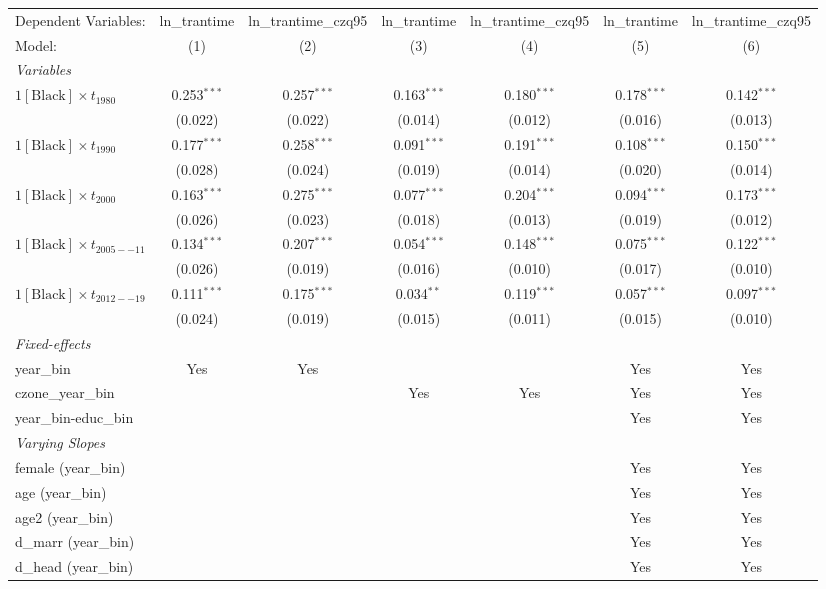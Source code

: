 \begin{tabular}{lcccccc}
\tabularnewline\midrule\midrule
Dependent Variables:&ln\_trantime&ln\_trantime\_czq95&ln\_trantime&ln\_trantime\_czq95&ln\_trantime&ln\_trantime\_czq95\\
Model:&(1) & (2) & (3) & (4) & (5) & (6)\\
\midrule \emph{Variables}&   &   &   &   &   &  \\
$1[\text{Black}] \times t_{1980}$ & 0.253$^{***}$ & 0.257$^{***}$ & 0.163$^{***}$ & 0.180$^{***}$ & 0.178$^{***}$ & 0.142$^{***}$\\
  &(0.022) & (0.022) & (0.014) & (0.012) & (0.016) & (0.013)\\
$1[\text{Black}] \times t_{1990}$ & 0.177$^{***}$ & 0.258$^{***}$ & 0.091$^{***}$ & 0.191$^{***}$ & 0.108$^{***}$ & 0.150$^{***}$\\
  &(0.028) & (0.024) & (0.019) & (0.014) & (0.020) & (0.014)\\
$1[\text{Black}] \times t_{2000}$ & 0.163$^{***}$ & 0.275$^{***}$ & 0.077$^{***}$ & 0.204$^{***}$ & 0.094$^{***}$ & 0.173$^{***}$\\
  &(0.026) & (0.023) & (0.018) & (0.013) & (0.019) & (0.012)\\
$1[\text{Black}] \times t_{2005--11}$ & 0.134$^{***}$ & 0.207$^{***}$ & 0.054$^{***}$ & 0.148$^{***}$ & 0.075$^{***}$ & 0.122$^{***}$\\
  &(0.026) & (0.019) & (0.016) & (0.010) & (0.017) & (0.010)\\
$1[\text{Black}] \times t_{2012--19}$ & 0.111$^{***}$ & 0.175$^{***}$ & 0.034$^{**}$ & 0.119$^{***}$ & 0.057$^{***}$ & 0.097$^{***}$\\
  &(0.024) & (0.019) & (0.015) & (0.011) & (0.015) & (0.010)\\
\midrule \emph{Fixed-effects}&   &   &   &   &   &  \\
year\_bin & Yes & Yes &  &  & Yes & Yes\\
czone\_year\_bin &  &  & Yes & Yes & Yes & Yes\\
year\_bin-educ\_bin &  &  &  &  & Yes & Yes\\
\midrule \emph{Varying Slopes}&   &   &   &   &   &  \\
female (year\_bin) &  &  &  &  & Yes & Yes\\
age (year\_bin) &  &  &  &  & Yes & Yes\\
age2 (year\_bin) &  &  &  &  & Yes & Yes\\
d\_marr (year\_bin) &  &  &  &  & Yes & Yes\\
d\_head (year\_bin) &  &  &  &  & Yes & Yes\\

\end{tabular}
